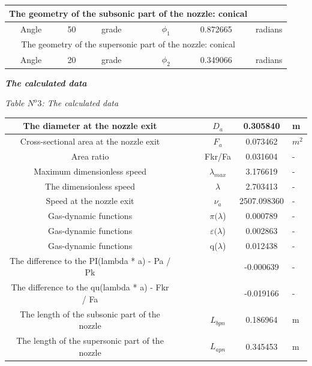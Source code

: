 \begin{center}
\begin{tabular}{  | c | c | c | c | c | c | c | }
\hline
\multicolumn{6}{|c}{ The geometry of the subsonic part of the nozzle: conical }&  \\
\hline
Angle & 50 & grade &  & $\phi_1$ & 0.872665 & radians \\
\hline
\multicolumn{6}{|c}{ The geometry of the supersonic part of the nozzle: conical }&  \\
\hline
Angle & 20 & grade &  & $\phi_2$ & 0.349066 & radians \\
\hline
\end{tabular}

\begin{center}
\textbf{\textit{The calculated data}}\\
\end{center}
\begin{flushright}
\textit{Table $N^o 3$: The calculated data}\\
\end{flushright}
\begin{tabular}{  | c | p{1.5cm} | p{1.5cm} | p{1.5cm} | c | c | p{1.5cm} | }
\hline
The diameter at the nozzle exit &  &  &  & $D_a$ & 0.305840 & m \\
\hline
Cross-sectional area at the nozzle exit &  &  &  & $F_a$ & 0.073462 & $m^2$ \\
\hline
Area ratio &  &  &  & Fkr/Fa & 0.031604 & - \\
\hline
Maximum dimensionless speed &  &  &  & $\lambda_{max}$ & 3.176619 & - \\
\hline
The dimensionless speed &  &  &  & $\lambda$ & 2.703413 & - \\
\hline
Speed at the nozzle exit &  &  &  & $\nu_a$ & 2507.098360 & - \\
\hline
Gas-dynamic functions &  &  &  & $\pi(\lambda$) & 0.000789 & - \\
\hline
Gas-dynamic functions &  &  &  & $\varepsilon(\lambda$) & 0.002863 & - \\
\hline
Gas-dynamic functions &  &  &  & q($\lambda$) & 0.012438 & - \\
\hline
The difference to the PI(lambda * a) - Pa / Pk &  &  &  &  & -0.000639 & - \\
\hline
The difference to the qu(lambda * a) - Fkr / Fa &  &  &  &  & -0.019166 & - \\
\hline
The length of the subsonic part of the nozzle &  &  &  & $L_{bpn}$ & 0.186964 & m \\
\hline
The length of the supersonic part of the nozzle &  &  &  & $L_{apn}$ & 0.345453 & m \\
\hline
\end{tabular}
\end{center}

